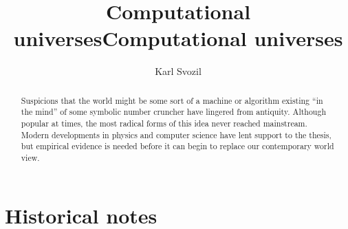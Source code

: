 \documentclass[pre,preprint,showpacs,showkeys,amsfonts]{revtex4}
\begin{document}
\title{\bf Computational universes}


\coverpage



\title{Computational universes}


\author{Karl  Svozil}



\begin{abstract}
Suspicions that the world might be some sort of a machine or algorithm existing ``in the mind''
of some symbolic number cruncher have lingered from antiquity. Although popular at times,
the most radical forms of this idea never reached mainstream.
Modern developments in physics and computer science have lent support to the thesis,
but empirical evidence is needed before it can begin to replace our contemporary world view.
\end{abstract}

\maketitle

\section{Historical notes}
\end{document}
